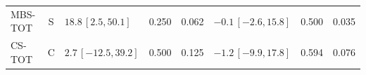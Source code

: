 \begin{longtable}{lcp{37mm}rrp{37mm}rr}
MBS-TOT & S & \(18.8\,[2.5,50.1]\) & 0.250 & 0.062 & \(-0.1\,[-2.6,15.8]\) & 0.500 & 0.035\\
CS-TOT & C & \(2.7\,[-12.5,39.2]\) & 0.500 & 0.125 & \(-1.2\,[-9.9,17.8]\) & 0.594 & 0.076\\

\end{longtable}
